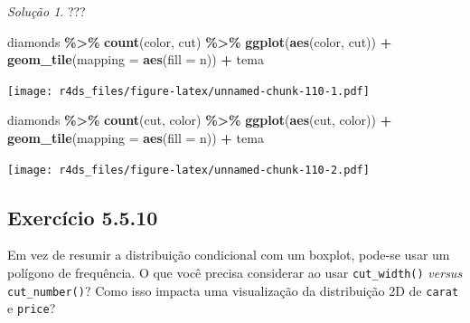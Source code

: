 \documentclass[
]{latex/krantz}
\newenvironment{Shaded}{\begin{snugshade}}{\end{snugshade}}
\newcommand{\AttributeTok}[1]{\textcolor[rgb]{0.13,0.29,0.53}{#1}}
\newcommand{\FunctionTok}[1]{\textcolor[rgb]{0.13,0.29,0.53}{\textbf{#1}}}
\newcommand{\NormalTok}[1]{#1}
\newcommand{\SpecialCharTok}[1]{\textcolor[rgb]{0.81,0.36,0.00}{\textbf{#1}}}
\theoremstyle{definition}
\theoremstyle{definition}
\theoremstyle{definition}
\theoremstyle{definition}
\theoremstyle{remark}
\newtheorem*{solution}{Solução}
\begin{document}
\begin{solution}
???

\begin{Shaded}
\begin{Highlighting}[]
\NormalTok{diamonds }\SpecialCharTok{\%\textgreater{}\%}
    \FunctionTok{count}\NormalTok{(color, cut) }\SpecialCharTok{\%\textgreater{}\%}    
    \FunctionTok{ggplot}\NormalTok{(}\FunctionTok{aes}\NormalTok{(color, cut)) }\SpecialCharTok{+}
        \FunctionTok{geom\_tile}\NormalTok{(}\AttributeTok{mapping =} \FunctionTok{aes}\NormalTok{(}\AttributeTok{fill =}\NormalTok{ n)) }\SpecialCharTok{+} 
\NormalTok{        tema}
\end{Highlighting}
\end{Shaded}

\texttt{[image: r4ds\_files/figure-latex/unnamed-chunk-110-1.pdf]}

\begin{Shaded}
\begin{Highlighting}[]
\NormalTok{diamonds }\SpecialCharTok{\%\textgreater{}\%}
    \FunctionTok{count}\NormalTok{(cut, color) }\SpecialCharTok{\%\textgreater{}\%}    
    \FunctionTok{ggplot}\NormalTok{(}\FunctionTok{aes}\NormalTok{(cut, color)) }\SpecialCharTok{+}
        \FunctionTok{geom\_tile}\NormalTok{(}\AttributeTok{mapping =} \FunctionTok{aes}\NormalTok{(}\AttributeTok{fill =}\NormalTok{ n)) }\SpecialCharTok{+} 
\NormalTok{        tema}
\end{Highlighting}
\end{Shaded}

\texttt{[image: r4ds\_files/figure-latex/unnamed-chunk-110-2.pdf]}
\end{solution}

\hypertarget{exr5-5-10}{%
\subsection*{Exercício 5.5.10}\label{exr5-5-10}}

Em vez de resumir a distribuição condicional com um boxplot, pode-se usar um polígono de frequência. O que você precisa considerar ao usar \texttt{cut\_width()} \emph{versus} \texttt{cut\_number()}? Como isso impacta uma visualização da distribuição 2D de \texttt{carat} e \texttt{price}?
\end{document}

